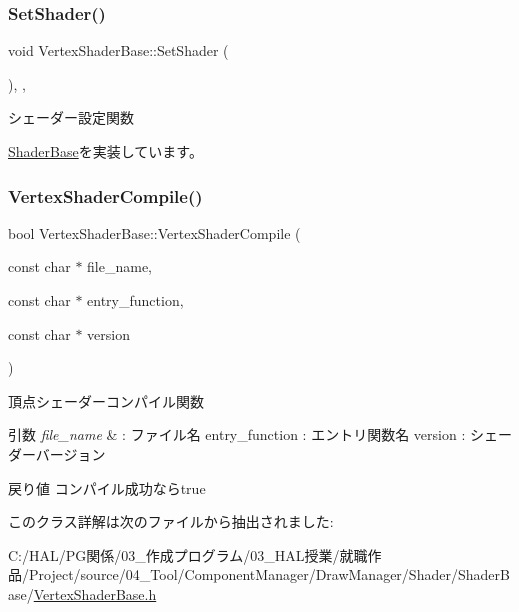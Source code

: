 \subsubsection{\texorpdfstring{Set\+Shader()}{SetShader()}}
{\footnotesize\ttfamily void Vertex\+Shader\+Base\+::\+Set\+Shader (\begin{DoxyParamCaption}{ }\end{DoxyParamCaption})\hspace{0.3cm}{\ttfamily [inline]}, {\ttfamily [override]}, {\ttfamily [virtual]}}



シェーダー設定関数 



\mbox{\hyperlink{class_shader_base_af45063254b80602db8626360d643baee}{Shader\+Base}}を実装しています。

\mbox{\label{class_vertex_shader_base_a6565abadb8ac173d3273ab1698d31c6c}} 
\subsubsection{\texorpdfstring{Vertex\+Shader\+Compile()}{VertexShaderCompile()}}
{\footnotesize\ttfamily bool Vertex\+Shader\+Base\+::\+Vertex\+Shader\+Compile (\begin{DoxyParamCaption}\item[{const char $\ast$}]{file\+\_\+name,  }\item[{const char $\ast$}]{entry\+\_\+function,  }\item[{const char $\ast$}]{version }\end{DoxyParamCaption})\hspace{0.3cm}{\ttfamily [inline]}}



頂点シェーダーコンパイル関数 


\begin{DoxyParams}{引数}
{\em file\+\_\+name} & \+: ファイル名 entry\+\_\+function \+: エントリ関数名 version \+: シェーダーバージョン \\
\hline
\end{DoxyParams}
\begin{DoxyReturn}{戻り値}
コンパイル成功ならtrue 
\end{DoxyReturn}


このクラス詳解は次のファイルから抽出されました\+:\begin{DoxyCompactItemize}
\item 
C\+:/\+H\+A\+L/\+P\+G関係/03\+\_\+作成プログラム/03\+\_\+\+H\+A\+L授業/就職作品/\+Project/source/04\+\_\+\+Tool/\+Component\+Manager/\+Draw\+Manager/\+Shader/\+Shader\+Base/\mbox{\hyperlink{_vertex_shader_base_8h}{Vertex\+Shader\+Base.\+h}}\end{DoxyCompactItemize}
